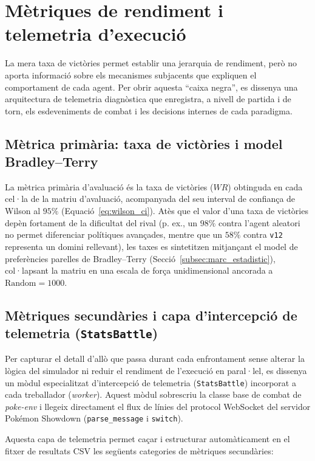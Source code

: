 \section{Mètriques de rendiment i telemetria d'execució}
\label{sec:metriques}

La mera taxa de victòries permet establir una jerarquia de rendiment, però no aporta informació sobre els mecanismes subjacents que expliquen el comportament de cada agent. Per obrir aquesta ``caixa negra'', es dissenya una arquitectura de telemetria diagnòstica que enregistra, a nivell de partida i de torn, els esdeveniments de combat i les decisions internes de cada paradigma.

\subsection{Mètrica primària: taxa de victòries i model Bradley--Terry}

La mètrica primària d'avaluació és la taxa de victòries ($WR$) obtinguda en cada cel·la de la matriu d'avaluació, acompanyada del seu interval de confiança de Wilson al $95\%$ (Equació~\ref{eq:wilson_ci}). Atès que el valor d'una taxa de victòries depèn fortament de la dificultat del rival (p. ex., un $98\%$ contra l'agent aleatori no permet diferenciar polítiques avançades, mentre que un $58\%$ contra \texttt{v12} representa un domini rellevant), les taxes es sintetitzen mitjançant el model de preferències parelles de Bradley--Terry (Secció~\ref{subsec:marc_estadistic}), col·lapsant la matriu en una escala de força unidimensional ancorada a $\text{Random} = 1000$.

\subsection{Mètriques secundàries i capa d'intercepció de telemetria (\texttt{StatsBattle})}

Per capturar el detall d'allò que passa durant cada enfrontament sense alterar la lògica del simulador ni reduir el rendiment de l'execució en paral·lel, es dissenya un mòdul especialitzat d'intercepció de telemetria (\texttt{StatsBattle}) incorporat a cada treballador (\textit{worker}). Aquest mòdul sobrescriu la classe base de combat de \textit{poke-env} i llegeix directament el flux de línies del protocol WebSocket del servidor Pokémon Showdown (\texttt{parse\_message} i \texttt{switch}).

Aquesta capa de telemetria permet caçar i estructurar automàticament en el fitxer de resultats CSV les següents categories de mètriques secundàries:

